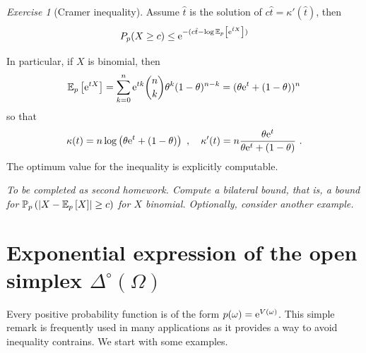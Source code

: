 \documentclass[12pt,a4paper]{amsart}
\theoremstyle{plain}%
\theoremstyle{definition}
\theoremstyle{remark}
\newtheorem{exercise}{Exercise}
\begin{document}
\begin{exercise}[Cramer inequality]
Assume $\hat t$ is the solution of $c\hat t = \kappa'(\hat t)$, then
\begin{equation*}
  P_p(X \geq c) \leq \mathrm{e}^{-(c\hat t - \log \operatorname{\mathbb E}_{p}\left[\mathrm{e}^{\hat tX}\right])}
\end{equation*}

In particular, if $X$ is binomial, then
\begin{equation*}
  \operatorname{\mathbb E}_{p}\left[\mathrm{e}^{tX}\right] = \sum_{k=0}^n \mathrm{e}^{tk} \binom n k \theta^k (1-\theta)^{n-k} = (\theta \mathrm{e}^t + (1 - \theta))^n 
\end{equation*}
so that
\begin{equation*}
  \kappa(t) = n \log\left(\theta \mathrm{e}^t + (1 - \theta)\right) \ , \quad \kappa'(t) = n \frac{\theta\mathrm{e}^t}{\theta \mathrm{e}^t + (1 - \theta)} \ .
\end{equation*}
The optimum value for the inequality is explicitly computable.

\emph{To be completed as second homework. Compute a bilateral bound, that is, a bound for $\operatorname{\mathbb P}_{p}\left(\left\vert X - \operatorname{\mathbb E}_{p}\left[X\right]\right\vert \geq c\right)$ for $X$ binomial. Optionally, consider another example.}
\end{exercise}

\section{Exponential expression of the open simplex $\Delta^\circ(\Omega)$}
\label{sec:expon-expr-delt}

Every positive probability function is of the form $p(\omega) = \mathrm{e}^{V(\omega)}$. This simple remark is frequently used in many applications as it provides a way to avoid inequality contrains. We start with some examples.
\end{document}
